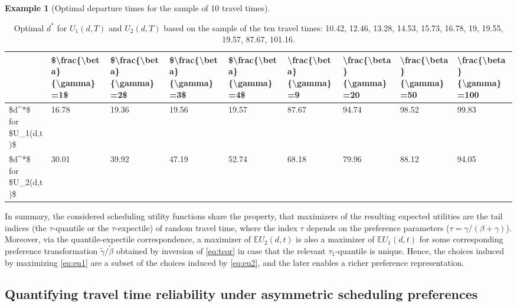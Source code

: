 \documentclass[
]{article}
\theoremstyle{definition}
\theoremstyle{definition}
\newtheorem{example}{Example}[section]
\theoremstyle{definition}
\theoremstyle{definition}
\theoremstyle{remark}
\begin{document}
\begin{example}[Optimal departure times for the sample of 10 travel times]
\begin{table}
\caption{\label{tab:table3}Optimal $d^*$ for $U_1(d,T)$ and $U_2(d,T)$ based on the sample of the ten travel times: 10.42, 12.46, 13.28, 14.53, 15.73, 16.78, 19, 19.55, 19.57, 87.67, 101.16.}
\centering
\begin{tabular}[t]{l|l|l|l|l|l|l|l|l}
\hline
  & \$\textbackslash{}frac\{\textbackslash{}beta\}\{\textbackslash{}gamma\}=1\$ & \$\textbackslash{}frac\{\textbackslash{}beta\}\{\textbackslash{}gamma\}=2\$ & \$\textbackslash{}frac\{\textbackslash{}beta\}\{\textbackslash{}gamma\}=3\$ & \$\textbackslash{}frac\{\textbackslash{}beta\}\{\textbackslash{}gamma\}=4\$ & \textbackslash{}frac\{\textbackslash{}beta\}\{\textbackslash{}gamma\}=9 & \textbackslash{}frac\{\textbackslash{}beta\}\{\textbackslash{}gamma\}=20 & \textbackslash{}frac\{\textbackslash{}beta\}\{\textbackslash{}gamma\}=50 & \textbackslash{}frac\{\textbackslash{}beta\}\{\textbackslash{}gamma\}=100\\
\hline
\$d\textasciicircum{}*\$ for \$U\_1(d,t)\$ & 16.78 & 19.36 & 19.56 & 19.57 & 87.67 & 94.74 & 98.52 & 99.83\\
\hline
\$d\textasciicircum{}*\$ for \$U\_2(d,t)\$ & 30.01 & 39.92 & 47.19 & 52.74 & 68.18 & 79.96 & 88.12 & 94.05\\
\hline
\end{tabular}
\end{table}

\end{example}

In summary, the considered scheduling utility functions share the property, that maximizers of the resulting expected utilities are the tail indices (the \(\tau\)-quantile or the \(\tau\)-expectile) of random travel time, where the index \(\tau\) depends on the preference parameters (\(\tau=\gamma/(\beta+\gamma)\)). Moreover, via the quantile-expectile correspondence, a maximizer of \(\mathbb EU_2(d,t)\) is also a maximizer of \(\mathbb EU_1(d,t)\) for some corresponding preference transformation \(\tilde\gamma/\tilde \beta\) obtained by inversion of \eqref{eq:tcor} in case that the relevant \(\tau_1\)-quantile is unique. Hence, the choices induced by maximizing \eqref{eq:eu1} are a subset of the choices induced by \eqref{eq:eu2}, and the later enables a richer preference representation.

\hypertarget{quantifying-travel-time-reliability-under-asymmetric-scheduling-preferences}{%
\subsection{Quantifying travel time reliability under asymmetric scheduling preferences}\label{quantifying-travel-time-reliability-under-asymmetric-scheduling-preferences}}
\end{document}
